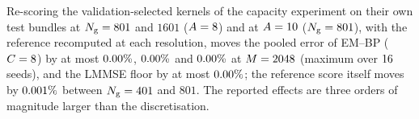 Re-scoring the validation-selected kernels of the capacity experiment on their own test
bundles at $N_{\mathrm{g}}=801$ and $1601$ ($A=8$) and at $A=10$
($N_{\mathrm{g}}=801$), with the reference recomputed at each resolution, moves the pooled error
of EM--BP ($C=8$) by at most $0.00\%$, $0.00\%$
and $0.00\%$ at $M=2048$ (maximum over $16$ seeds), and the
LMMSE floor by at most $0.00\%$; the reference score itself moves by
$0.001\%$ between $N_{\mathrm{g}}=401$ and $801$. The reported effects are three
orders of magnitude larger than the discretisation.
